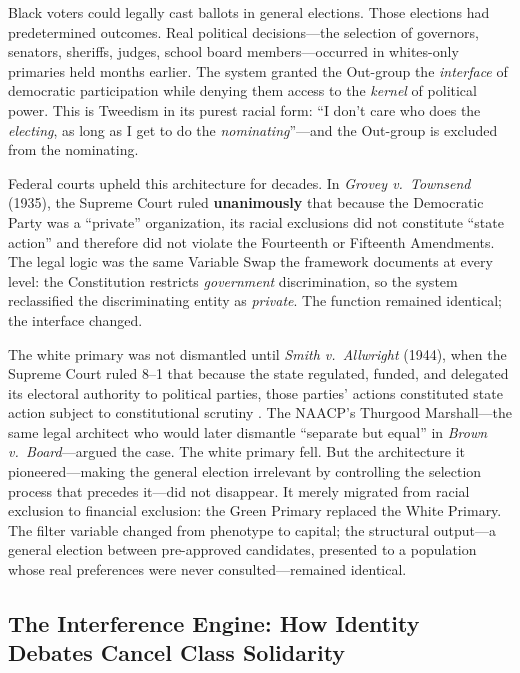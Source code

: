 \documentclass[12pt,openany]{book}
\begin{document}
Black voters could legally cast ballots in general elections. Those elections had predetermined outcomes. Real political decisions---the selection of governors, senators, sheriffs, judges, school board members---occurred in whites-only primaries held months earlier. The system granted the Out-group the \textit{interface} of democratic participation while denying them access to the \textit{kernel} of political power. This is Tweedism in its purest racial form: ``I don't care who does the \textit{electing}, as long as I get to do the \textit{nominating}''---and the Out-group is excluded from the nominating.

Federal courts upheld this architecture for decades. In \textit{Grovey v.\ Townsend} (1935), the Supreme Court ruled \textbf{unanimously} that because the Democratic Party was a ``private'' organization, its racial exclusions did not constitute ``state action'' and therefore did not violate the Fourteenth or Fifteenth Amendments. The legal logic was the same Variable Swap the framework documents at every level: the Constitution restricts \textit{government} discrimination, so the system reclassified the discriminating entity as \textit{private}. The function remained identical; the interface changed.

The white primary was not dismantled until \textit{Smith v.\ Allwright} (1944), when the Supreme Court ruled 8--1 that because the state regulated, funded, and delegated its electoral authority to political parties, those parties' actions constituted state action subject to constitutional scrutiny \cite{smith_v_allwright}. The NAACP's Thurgood Marshall---the same legal architect who would later dismantle ``separate but equal'' in \textit{Brown v.\ Board}---argued the case. The white primary fell. But the architecture it pioneered---making the general election irrelevant by controlling the selection process that precedes it---did not disappear. It merely migrated from racial exclusion to financial exclusion: the Green Primary replaced the White Primary. The filter variable changed from phenotype to capital; the structural output---a general election between pre-approved candidates, presented to a population whose real preferences were never consulted---remained identical.

\subsection{The Interference Engine: How Identity Debates Cancel Class Solidarity}
\end{document}
